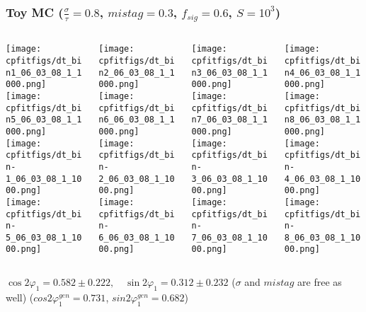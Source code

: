 \documentclass[10 pt,compress,mathserif]{beamer}
\begin{document}
\begin{frame}
 \frametitle{Toy MC ($\frac{\sigma}{\tau}=0.8$, $mistag = 0.3$, $f_{sig} = 0.6$, $S = 10^3$)}
 \begin{columns}
  \begin{column}{0.25\textwidth}
   \texttt{[image: cpfitfigs/dt\_bin1\_06\_03\_08\_1\_1000.png]}\\
   \texttt{[image: cpfitfigs/dt\_bin5\_06\_03\_08\_1\_1000.png]}\\
   \texttt{[image: cpfitfigs/dt\_bin-1\_06\_03\_08\_1\_1000.png]}\\
   \texttt{[image: cpfitfigs/dt\_bin-5\_06\_03\_08\_1\_1000.png]}
  \end{column}
  \begin{column}{0.25\textwidth}
   \texttt{[image: cpfitfigs/dt\_bin2\_06\_03\_08\_1\_1000.png]}\\
   \texttt{[image: cpfitfigs/dt\_bin6\_06\_03\_08\_1\_1000.png]}\\
   \texttt{[image: cpfitfigs/dt\_bin-2\_06\_03\_08\_1\_1000.png]}\\
   \texttt{[image: cpfitfigs/dt\_bin-6\_06\_03\_08\_1\_1000.png]}
  \end{column}
  \begin{column}{0.25\textwidth}
   \texttt{[image: cpfitfigs/dt\_bin3\_06\_03\_08\_1\_1000.png]}\\
   \texttt{[image: cpfitfigs/dt\_bin7\_06\_03\_08\_1\_1000.png]}\\
   \texttt{[image: cpfitfigs/dt\_bin-3\_06\_03\_08\_1\_1000.png]}\\
   \texttt{[image: cpfitfigs/dt\_bin-7\_06\_03\_08\_1\_1000.png]}
  \end{column}
  \begin{column}{0.25\textwidth}
   \texttt{[image: cpfitfigs/dt\_bin4\_06\_03\_08\_1\_1000.png]}\\
   \texttt{[image: cpfitfigs/dt\_bin8\_06\_03\_08\_1\_1000.png]}\\
   \texttt{[image: cpfitfigs/dt\_bin-4\_06\_03\_08\_1\_1000.png]}\\
   \texttt{[image: cpfitfigs/dt\_bin-8\_06\_03\_08\_1\_1000.png]}
  \end{column}
 \end{columns}
 \begin{center}
  $\cos{2\varphi_1} = 0.582 \pm 0.222,\quad \sin{2\varphi_1} = 0.312 \pm 0.232$
  ($\sigma$ and $mistag$ are free as well)  ($cos2\varphi^{gen}_1 = 0.731$, $sin2\varphi^{gen}_1 = 0.682$)
 \end{center}
\end{frame}
\end{document}
